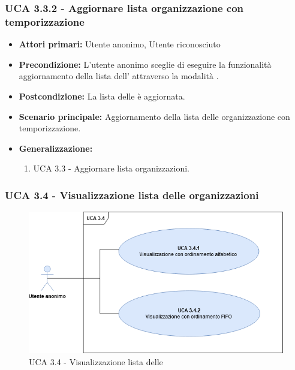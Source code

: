 \subsubsection{UCA 3.3.2 - Aggiornare lista organizzazione con temporizzazione}%
\begin{itemize} 
	\item \textbf{Attori primari:} Utente anonimo, Utente riconosciuto
	\item \textbf{Precondizione:} L'utente anonimo sceglie di eseguire la funzionalità aggiornamento della lista dell' attraverso la modalità .
	\item \textbf{Postcondizione:} La lista delle  è aggiornata.
	\item \textbf{Scenario principale:} Aggiornamento della lista delle organizzazione con temporizzazione.
	\item \textbf{Generalizzazione:}
	\begin{enumerate}
	\item UCA 3.3 - Aggiornare lista organizzazioni.
	\end{enumerate}	
\end{itemize}

\subsubsection{UCA 3.4 - Visualizzazione lista delle organizzazioni}%

\begin{figure}[h]
	\centering	
	\includegraphics[scale=0.45, center]{Sezioni/UseCase/Immagini/UCA3.4.png}
	\caption{UCA 3.4 - Visualizzazione lista delle }
\end{figure}

